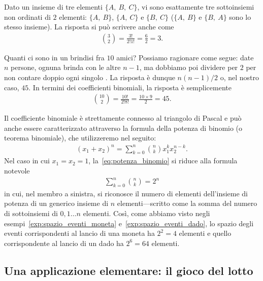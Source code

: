 \begin{examplebox}
  \begin{example}
    Dato un insieme di tre elementi $\{A,~B,~C\}$, vi sono esattamente tre
    sottoinsiemi non ordinati di $2$ elementi: $\{A,~B\}$, $\{A,~C\}$ e
    $\{B,~C\}$ ($\{A,~B\}$ e $\{B,~A\}$ sono lo stesso insieme).
    La risposta si può scrivere anche come
    \begin{align*}
      \binom{3}{2} = \frac{3!}{2!1!} = \frac{6}{2} = 3.
    \end{align*}
  \end{example}

  \begin{example}
    Quanti  ci sono in un brindisi fra $10$ amici? Possiamo
    ragionare come segue: date $n$ persone, ognuna brinda con le altre
    $n - 1$, ma dobbiamo poi dividere per $2$ per non contare doppio ogni
    singolo . La risposta è dunque $n(n - 1)/2$ o, nel nostro
    caso, $45$. In termini dei coefficienti binomiali, la risposta è
    semplicemente
    \begin{align*}
      \binom{10}{2} = \frac{10!}{2!8!} = \frac{10 \times 9}{2} = 45.
    \end{align*}
  \end{example}
\end{examplebox}

Il coefficiente binomiale è strettamente connesso al triangolo di Pascal e
può anche essere caratterizzato attraverso la formula della potenza di
binomio (o teorema binomiale), che utilizzeremo nel seguito:
\begin{align}\label{eq:potenza_binomio}
  (x_1 + x_2)^n = \sum_{k=0}^{n}\binom{n}{k} x_1^k x_2^{n-k}.
\end{align}
Nel caso in cui $x_1 = x_2 = 1$, la~\eqref{eq:potenza_binomio} si riduce alla
formula notevole
\begin{align}
  \sum_{k=0}^{n}\binom{n}{k} = 2^n
\end{align}
in cui, nel membro a sinistra, si riconosce il numero di elementi dell'insieme
di potenza di un generico insieme di $n$ elementi---scritto come la somma del
numero di sottoinsiemi di $0, 1\ldots n$ elementi. Così, come abbiamo visto
negli esempi~\ref{exp:spazio_eventi_moneta} e~\ref{exp:spazio_eventi_dado},
lo spazio degli eventi corrispondenti al lancio di una moneta ha $2^2 = 4$
elementi e quello corrispondente al lancio di un dado ha $2^6 = 64$ elementi.


\subsection{Una applicazione elementare: il gioco del lotto}
\label{sec:lotto_probabilita}

